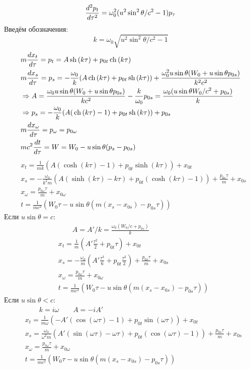 \[	
	\frac{d^2 p_t}{d \tau^2} = \omega_0^2 (u^2 \sin^2 \theta/c^2 - 1) p_\tau
\]
Введём обозначения:
\[
	k = \omega_0 \sqrt{u^2 \sin^2 \theta/c^2 - 1}
\]
\[
	\begin{aligned}
	& m\frac{d x_t}{d \tau} = p_t = A \,\mathrm{sh}\, (k\tau) + p_{0t} \,\mathrm{ch}\,(k\tau) \\
	& m\frac{d x_s}{d \tau} = p_s = - \frac{\omega_0}{k} (A \,\mathrm{ch}\, (k\tau) + p_{0t} \,\mathrm{sh}\, (k\tau)) + \frac{\omega_0^2 u \sin \theta (W_0 + u \sin \theta p_{0s})}{k^2 c^2} \\
	& \Rightarrow A = \frac{\omega_0 u \sin \theta (W_0 + u \sin \theta p_{0s})}{k c^2} - \frac{k}{\omega_0} p_{0s}  = 
	\frac{\omega_0 (u \sin \theta W_0/c^2 + p_{0s})}{k} \\
	& \Rightarrow p_s = - \frac{\omega_0}{k} (A (\,\mathrm{ch}\, (k\tau) - 1) + p_{0t} \,\mathrm{sh}\, (k\tau)) + p_{0s} \\
	& m\frac{d x_\omega}{d \tau} = p_\omega = p_{0\omega} \\
	& m c^2\frac{d t}{d \tau} = W = W_0 - u \sin \theta (p_s - p_{0s})
	\end{aligned}
\]
\[
	\begin{aligned}
	& x_t = \frac{1}{mk} (A (\cosh (k\tau) - 1) + p_{0t} \sinh(k\tau)) + x_{0t} \\
	& x_s = - \frac{\omega_0}{k^2m} (A (\sinh (k\tau) - k\tau) + p_{0t} (\cosh (k\tau) - 1)) + \frac{p_{0s} \tau}{m} + x_{0s} \\
	& x_\omega = \frac{p_{0\omega} \tau}{m} + x_{0\omega} \\
	& t = \frac{1}{mc^2} (W_0 \tau - u \sin \theta (m (x_s - x_{0s}) - p_{0s} \tau))
	\end{aligned}
\]
Если $u \sin \theta = c$:
\[
	\begin{aligned}
	& \qquad A = A'/k = \frac{\omega_0 (W_0/c + p_{0s})}{k}\\
	& x_t = \frac{1}{m} (A'\frac{\tau^2}{2} + p_{0t} \tau) + x_{0t} \\
	& x_s = - \frac{\omega_0}{m} \left(A' \frac{\tau^3}{6} + p_{0t} \frac{\tau^2}{2}\right) + \frac{p_{0s} \tau}{m} + x_{0s} \\
	& x_\omega = \frac{p_{0\omega} \tau}{m} + x_{0\omega} \\
	& t = \frac{1}{mc^2} (W_0 \tau - u \sin \theta (m (x_s - x_{0s}) - p_{0s} \tau))
	\end{aligned}
\]
Если $u \sin \theta < c$:
\[
	\begin{aligned}
	& \qquad k = i \omega \qquad A = - i A'\\
	& x_t = \frac{1}{m\omega} (- A' (\cos (\omega\tau) - 1) + p_{0t} \sin(\omega\tau)) + x_{0t} \\
	& x_s = \frac{\omega_0}{\omega^2m} (A' (\sin (\omega \tau) - \omega \tau) + p_{0t} (\cos (\omega \tau) - 1)) + \frac{p_{0s} \tau}{m} + x_{0s} \\
	& x_\omega = \frac{p_{0\omega} \tau}{m} + x_{0\omega} \\
	& t = \frac{1}{mc^2} (W_0 \tau - u \sin \theta (m (x_s - x_{0s}) - p_{0s} \tau))
	\end{aligned}
\]
